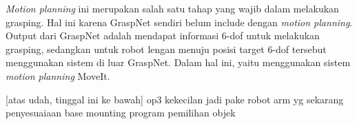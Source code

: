 \emph{Motion planning} ini merupakan salah satu tahap yang wajib dalam melakukan grasping.
Hal ini karena GraspNet sendiri belum include dengan \emph{motion planning}. Output dari GraspNet
adalah mendapat informasi 6-dof untuk melakukan grasping, sedangkan untuk robot lengan menuju posisi
target 6-dof tersebut menggunakan sistem di luar GraspNet. Dalam hal ini, yaitu menggunakan sistem \emph{motion
planning} MoveIt.

[atas udah, tinggal ini ke bawah] op3 kekecilan jadi pake robot arm yg sekarang
penyesuaiaan base mounting
program pemilihan objek